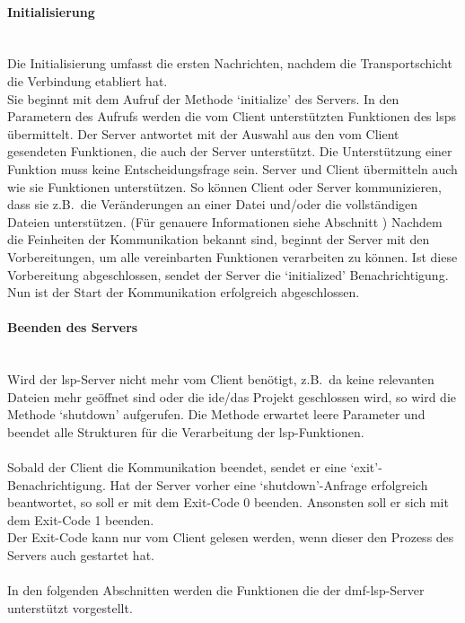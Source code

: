 \documentclass[./einleitung.tex]{subfiles}
\begin{document}
    \paragraph{Initialisierung}\mbox{}\\
    Die Initialisierung umfasst die ersten Nachrichten, nachdem die Transportschicht die Verbindung etabliert hat. \\
    Sie beginnt mit dem Aufruf der Methode `initialize' des Servers.
    In den Parametern des Aufrufs werden die vom Client unterstützten Funktionen des \acrshort{lsp}s übermittelt.
    Der Server antwortet mit der Auswahl aus den vom Client gesendeten Funktionen, die auch der Server unterstützt.
    Die Unterstützung einer Funktion muss keine Entscheidungsfrage sein.
    Server und Client übermitteln auch wie sie Funktionen unterstützen.
    So können Client oder Server kommunizieren, dass sie z.B.\ die Veränderungen an einer Datei und/oder die vollständigen Dateien unterstützen.
    (Für genauere Informationen siehe Abschnitt )
    \newline
    \newline
    Nachdem die Feinheiten der Kommunikation bekannt sind, beginnt der Server mit den Vorbereitungen, um alle vereinbarten Funktionen verarbeiten zu können.
    Ist diese Vorbereitung abgeschlossen, sendet der Server die `initialized' Benachrichtigung.
    Nun ist der Start der Kommunikation erfolgreich abgeschlossen.


    \paragraph{Beenden des Servers}\mbox{}\\
    Wird der \acrshort{lsp}-Server nicht mehr vom Client benötigt, z.B.\ da keine relevanten Dateien mehr geöffnet sind oder die \acrshort{ide}/das Projekt geschlossen wird, so wird die Methode `shutdown' aufgerufen.
    Die Methode erwartet leere Parameter und beendet alle Strukturen für die Verarbeitung der \acrshort{lsp}-Funktionen.
    \\\\
    Sobald der Client die Kommunikation beendet, sendet er eine `exit'-Benachrichtigung.
    Hat der Server vorher eine `shutdown'-Anfrage erfolgreich beantwortet, so soll er mit dem Exit-Code 0 beenden.
    Ansonsten soll er sich mit dem Exit-Code 1 beenden.\\
    Der Exit-Code kann nur vom Client gelesen werden, wenn dieser den Prozess des Servers auch gestartet hat.
    \\\\
    In den folgenden Abschnitten werden die Funktionen die der \acrshort{dmf}-\acrshort{lsp}-Server unterstützt vorgestellt.
\end{document}
